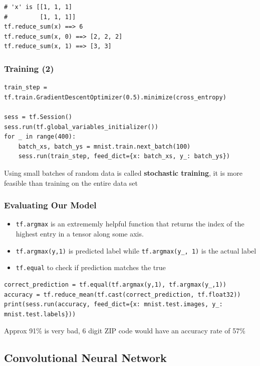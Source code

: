 \documentclass[11pt]{article}
\begin{document}
\begin{verbatim}
# 'x' is [[1, 1, 1]
#         [1, 1, 1]]
tf.reduce_sum(x) ==> 6
tf.reduce_sum(x, 0) ==> [2, 2, 2]
tf.reduce_sum(x, 1) ==> [3, 3]
\end{verbatim}
\subsubsection*{Training (2)}
\label{sec:org72e8f71}

\begin{verbatim}
train_step = tf.train.GradientDescentOptimizer(0.5).minimize(cross_entropy)

sess = tf.Session()
sess.run(tf.global_variables_initializer())
for _ in range(400):
    batch_xs, batch_ys = mnist.train.next_batch(100)
    sess.run(train_step, feed_dict={x: batch_xs, y_: batch_ys})
\end{verbatim}

Using small batches of random data is called \textbf{stochastic training}, it is more
feasible than training on the entire data set
\subsubsection*{Evaluating Our Model}
\label{sec:orgb7d34b0}

\begin{itemize}
\item \texttt{tf.argmax} is an extrememly helpful function that returns the index of the highest entry in a tensor along some axis.
\item \texttt{tf.argmax(y,1)} is predicted label while \texttt{tf.argmax(y\_, 1)} is the actual label
\item \texttt{tf.equal} to check if prediction matches the true
\end{itemize}

\begin{verbatim}
correct_prediction = tf.equal(tf.argmax(y,1), tf.argmax(y_,1))
accuracy = tf.reduce_mean(tf.cast(correct_prediction, tf.float32))
print(sess.run(accuracy, feed_dict={x: mnist.test.images, y_: mnist.test.labels}))
\end{verbatim}

Approx 91\% is very bad, 6 digit ZIP code would have an accuracy rate of 57\% 
\subsection*{Convolutional Neural Network}
\label{sec:orgc5c9ed1}
\end{document}
